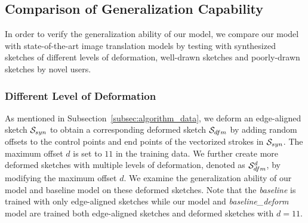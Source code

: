 \subsection{Comparison of Generalization Capability}

In order to verify the generalization ability of our model, we compare our model with state-of-the-art image translation models by testing with synthesized sketches of different levels of deformation, well-drawn sketches and poorly-drawn sketches by novel users.

\subsubsection{Different Level of Deformation}
As mentioned in Subsection~\ref{subsec:algorithm_data}, we deform an edge-aligned sketch $\mathcal{S}_{syn}$ to obtain a corresponding deformed sketch $\mathcal{S}_{dfm}$ by adding random offsets to the control points and end points of the vectorized strokes in $\mathcal{S}_{syn}$. 
The maximum offset $d$ is set to $11$ in the training data. 
We further create more deformed sketches with multiple levels of deformation, denoted as $\mathcal{S}_{dfm}^d$, by modifying the maximum offset $d$.
%
We examine the generalization ability of our model and baseline model on these deformed sketches. 
Note that the \textit{baseline} is trained with only edge-aligned sketches while our model and \textit{baseline\_deform} model are trained both edge-aligned sketches and deformed sketches with $d=11$.

